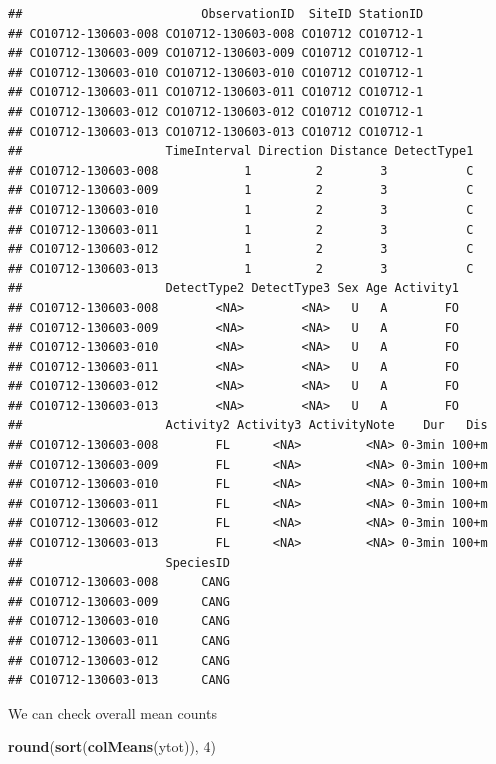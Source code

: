 \documentclass[12pt,]{book}
\newenvironment{Shaded}{\begin{snugshade}}{\end{snugshade}}
\newcommand{\DecValTok}[1]{\textcolor[rgb]{0.00,0.00,0.81}{#1}}
\newcommand{\KeywordTok}[1]{\textcolor[rgb]{0.13,0.29,0.53}{\textbf{#1}}}
\newcommand{\NormalTok}[1]{#1}
\begin{document}
\begin{verbatim}
##                         ObservationID  SiteID StationID
## CO10712-130603-008 CO10712-130603-008 CO10712 CO10712-1
## CO10712-130603-009 CO10712-130603-009 CO10712 CO10712-1
## CO10712-130603-010 CO10712-130603-010 CO10712 CO10712-1
## CO10712-130603-011 CO10712-130603-011 CO10712 CO10712-1
## CO10712-130603-012 CO10712-130603-012 CO10712 CO10712-1
## CO10712-130603-013 CO10712-130603-013 CO10712 CO10712-1
##                    TimeInterval Direction Distance DetectType1
## CO10712-130603-008            1         2        3           C
## CO10712-130603-009            1         2        3           C
## CO10712-130603-010            1         2        3           C
## CO10712-130603-011            1         2        3           C
## CO10712-130603-012            1         2        3           C
## CO10712-130603-013            1         2        3           C
##                    DetectType2 DetectType3 Sex Age Activity1
## CO10712-130603-008        <NA>        <NA>   U   A        FO
## CO10712-130603-009        <NA>        <NA>   U   A        FO
## CO10712-130603-010        <NA>        <NA>   U   A        FO
## CO10712-130603-011        <NA>        <NA>   U   A        FO
## CO10712-130603-012        <NA>        <NA>   U   A        FO
## CO10712-130603-013        <NA>        <NA>   U   A        FO
##                    Activity2 Activity3 ActivityNote    Dur   Dis
## CO10712-130603-008        FL      <NA>         <NA> 0-3min 100+m
## CO10712-130603-009        FL      <NA>         <NA> 0-3min 100+m
## CO10712-130603-010        FL      <NA>         <NA> 0-3min 100+m
## CO10712-130603-011        FL      <NA>         <NA> 0-3min 100+m
## CO10712-130603-012        FL      <NA>         <NA> 0-3min 100+m
## CO10712-130603-013        FL      <NA>         <NA> 0-3min 100+m
##                    SpeciesID
## CO10712-130603-008      CANG
## CO10712-130603-009      CANG
## CO10712-130603-010      CANG
## CO10712-130603-011      CANG
## CO10712-130603-012      CANG
## CO10712-130603-013      CANG
\end{verbatim}

We can check overall mean counts

\begin{Shaded}
\begin{Highlighting}[]
\KeywordTok{round}\NormalTok{(}\KeywordTok{sort}\NormalTok{(}\KeywordTok{colMeans}\NormalTok{(ytot)), }\DecValTok{4}\NormalTok{)}
\end{Highlighting}
\end{Shaded}
\end{document}
